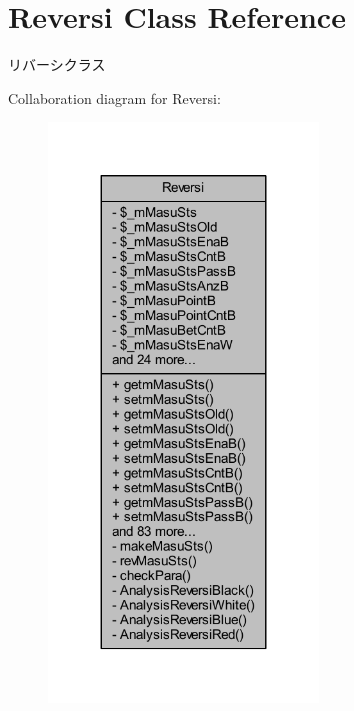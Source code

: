 \hypertarget{class_reversi}{}\section{Reversi Class Reference}
\label{class_reversi}


リバーシクラス  




Collaboration diagram for Reversi\+:
\nopagebreak
\begin{figure}[H]
\begin{center}
\leavevmode
\includegraphics[width=203pt]{class_reversi__coll__graph}
\end{center}
\end{figure}
